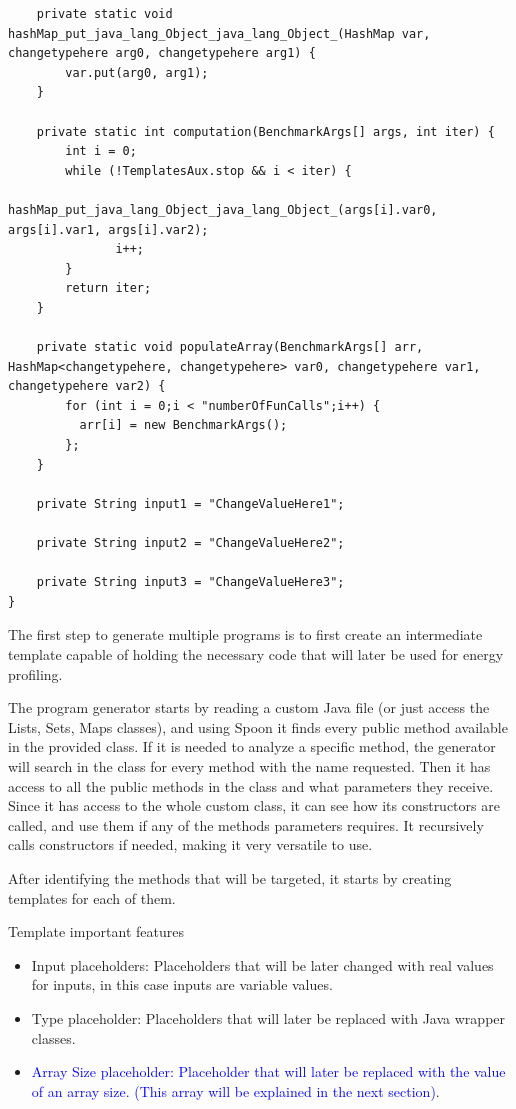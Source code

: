 \begin{verbatim}
    private static void hashMap_put_java_lang_Object_java_lang_Object_(HashMap var, changetypehere arg0, changetypehere arg1) {
        var.put(arg0, arg1);
    }

    private static int computation(BenchmarkArgs[] args, int iter) {
        int i = 0;
        while (!TemplatesAux.stop && i < iter) {
              hashMap_put_java_lang_Object_java_lang_Object_(args[i].var0, args[i].var1, args[i].var2);
               i++;
        }
        return iter;
    }

    private static void populateArray(BenchmarkArgs[] arr, HashMap<changetypehere, changetypehere> var0, changetypehere var1, changetypehere var2) {
        for (int i = 0;i < "numberOfFunCalls";i++) {
          arr[i] = new BenchmarkArgs();
        };
    }

    private String input1 = "ChangeValueHere1";

    private String input2 = "ChangeValueHere2";

    private String input3 = "ChangeValueHere3";
}

\end{verbatim}


The first step to generate multiple programs is to first create an intermediate template capable of holding the necessary code that will later be used for energy profiling.

The program generator starts by reading a custom Java file (or just access the Lists, Sets, Maps classes), and using Spoon it finds every public method available in the provided class. If it is needed to analyze a specific method, the generator will search in the class for every method with the name requested. Then it has access to all the public methods in the class and what parameters they receive.
Since it has access to the whole custom class, it can see how its constructors are called, and use them if any of the methods parameters requires. It recursively calls constructors if needed, making it very versatile to use. 

After identifying the methods that will be targeted, it starts by creating templates for each of them. 

Template important features

\begin{itemize}

  \item Input placeholders: Placeholders that will be later changed with real values for inputs, in this case inputs are variable values. 

  \item Type placeholder: Placeholders that will later be replaced with Java wrapper classes.
  
  \item \textcolor{blue}{Array Size placeholder: Placeholder that will later be replaced with the value of an array size. (This array will be explained in the next section)}. 

\end{itemize}

